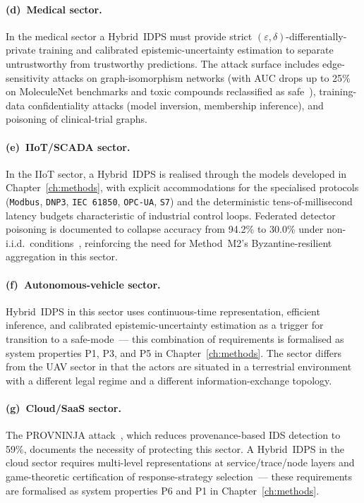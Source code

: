\paragraph{(d)~Medical sector.} In the medical sector a Hybrid~IDPS must provide strict $(\varepsilon,\delta)$-differentially-private training and calibrated epistemic-uncertainty estimation to separate untrustworthy from trustworthy predictions. The attack surface includes edge-sensitivity attacks on graph-isomorphism networks (with AUC drops up to 25\% on MoleculeNet benchmarks and toxic compounds reclassified as safe~\cite{EdgeSensitivity2025}), training-data confidentiality attacks (model inversion, membership inference), and poisoning of clinical-trial graphs.

\paragraph{(e)~IIoT/SCADA sector.} In the IIoT sector, a Hybrid~IDPS is realised through the models developed in Chapter~\ref{ch:methods}, with explicit accommodations for the specialised protocols (\texttt{Modbus}, \texttt{DNP3}, \texttt{IEC~61850}, \texttt{OPC-UA}, \texttt{S7}) and the deterministic tens-of-millisecond latency budgets characteristic of industrial control loops. Federated detector poisoning is documented to collapse accuracy from 94.2\% to 30.0\% under non-i.i.d.\ conditions~\cite{FerragPoisoning2023}, reinforcing the need for Method~M2's Byzantine-resilient aggregation in this sector.

\paragraph{(f)~Autonomous-vehicle sector.} Hybrid~IDPS in this sector uses continuous-time representation, efficient inference, and calibrated epistemic-uncertainty estimation as a trigger for transition to a safe-mode~--- this combination of requirements is formalised as system properties P1, P3, and P5 in Chapter~\ref{ch:methods}. The sector differs from the UAV sector in that the actors are situated in a terrestrial environment with a different legal regime and a different information-exchange topology.

\paragraph{(g)~Cloud/SaaS sector.} The PROVNINJA attack~\cite{PROVNINJA2023}, which reduces provenance-based IDS detection to 59\%, documents the necessity of protecting this sector. A Hybrid~IDPS in the cloud sector requires multi-level representations at service/trace/node layers and game-theoretic certification of response-strategy selection~--- these requirements are formalised as system properties P6 and P1 in Chapter~\ref{ch:methods}.

